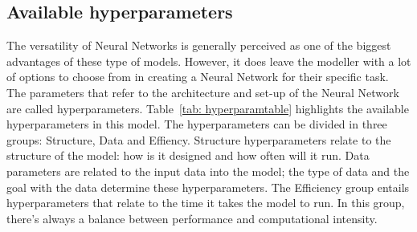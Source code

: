\documentclass[twocolumn, 10pt, a4paper]{memoir}
\begin{document}
		\subsection{Available hyperparameters} \label{Avail hyper}
		The versatility of Neural Networks is generally perceived as one of the biggest advantages of these type of models. However, it does leave the modeller with a lot of options to choose from in creating a Neural Network for their specific task. The parameters that refer to the architecture and set-up of the Neural Network are called hyperparameters. Table~\ref{tab: hyperparamtable} highlights the available hyperparameters in this model. The hyperparameters can be divided in three groups: Structure, Data and Effiency. Structure hyperparameters relate to the structure of the model: how is it designed and how often will it run. Data parameters are related to the input data into the model; the type of data and the goal with the data determine these hyperparameters. The Efficiency group entails hyperparameters that relate to the time it takes the model to run. In this group, there's always a balance between performance and computational intensity.
\end{document}
